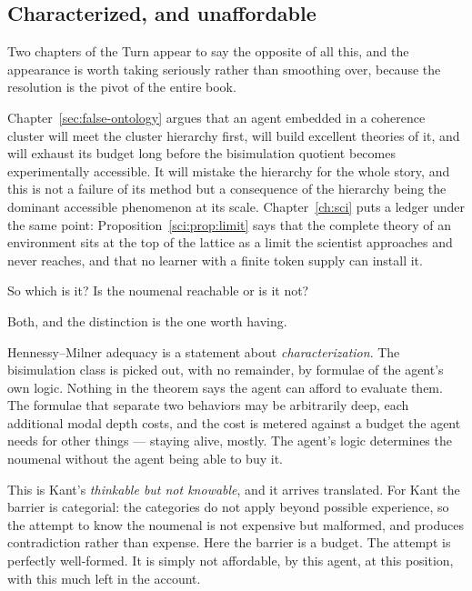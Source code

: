 \subsection{Characterized, and unaffordable}
\label{sec:kant-affordable}

Two chapters of the Turn appear to say the opposite of all this,
and the appearance is worth taking seriously rather than
smoothing over, because the resolution is the pivot of the entire
book.

Chapter~\ref{sec:false-ontology} argues that an agent embedded in a
coherence cluster will meet the cluster hierarchy first, will build
excellent theories of it, and will exhaust its budget long before
the bisimulation quotient becomes experimentally accessible.
It will mistake the hierarchy for the whole story, and this is not
a failure of its method but a consequence of the hierarchy being
the dominant accessible phenomenon at its scale.
Chapter~\ref{ch:sci} puts a ledger under the same point:
Proposition~\ref{sci:prop:limit} says that the complete theory of an
environment sits at the top of the lattice as a limit the scientist
approaches and never reaches, and that no learner with a finite
token supply can install it.

So which is it?
Is the noumenal reachable or is it not?

Both, and the distinction is the one worth having.

Hennessy--Milner adequacy is a statement about \emph{characterization}.
The bisimulation class is picked out, with no remainder, by
formulae of the agent's own logic.
Nothing in the theorem says the agent can afford to evaluate them.
The formulae that separate two behaviors may be arbitrarily deep,
each additional modal depth costs, and the cost is metered against
a budget the agent needs for other things --- staying alive, mostly.
The agent's logic determines the noumenal without the agent being
able to buy it.

This is Kant's \emph{thinkable but not knowable}, and it arrives
translated.
For Kant the barrier is categorial: the categories do not apply
beyond possible experience, so the attempt to know the noumenal is
not expensive but malformed, and produces contradiction rather than
expense.
Here the barrier is a budget.
The attempt is perfectly well-formed.
It is simply not affordable, by this agent, at this position, with
this much left in the account.

